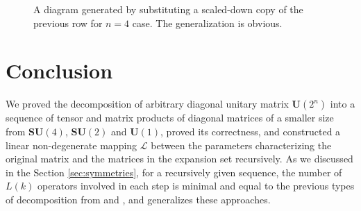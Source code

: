 \documentclass[a4paper, openany, 12pt]{article}
\theoremstyle{remark}
\theoremstyle{definition}
\newcommand{\un}{\mathbf{U}(2^n)}
\begin{document}
\begin{figure}
    \caption{A diagram generated by substituting a scaled-down copy of the previous row for $n = 4$ case. The generalization is obvious.}
    \label{fig:visual_proof_multi_spaces}
\end{figure}

\section{Conclusion}

We proved the decomposition of arbitrary diagonal unitary matrix $\un$  into a sequence of tensor and matrix products of diagonal matrices of a smaller size from  $\mathbf{SU}(4)$, $\mathbf{SU}(2)$ and $\mathbf{U}(1)$, proved its correctness, and constructed a linear non-degenerate mapping $\mathcal{L}$ between the parameters characterizing the original matrix and the matrices in the expansion set recursively. As we discussed in the Section \ref{sec:symmetries}, for a recursively given sequence, the number of $L(k)$ operators involved in each step is minimal and equal to the previous types of decomposition from \cite{crooks2024} and \cite{1629135}, and generalizes these approaches.
\end{document}
